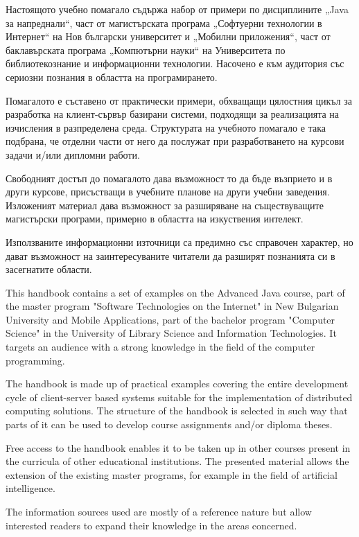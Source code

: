 ﻿Настоящото учебно помагало съдържа набор от примери по дисциплините „Java за напреднали“, част от магистърската програма „Софтуерни технологии в Интернет“ на Нов български университет и „Мобилни приложения“, част от баклавърската програма „Компютърни науки“ на Университета по библиотекознание и информационни технологии. Насочено е към аудитория със сериозни познания в областта на програмирането. 

Помагалото е съставено от практически примери, обхващащи цялостния цикъл за разработка на клиент-сървър базирани системи, подходящи за реализацията на изчисления в разпределена среда. Структурата на учебното помагало е така подбрана, че отделни части от него да послужат при разработването на курсови задачи и/или дипломни работи.

Свободният достъп до помагалото дава възможност то да бъде възприето и в други курсове, присъстващи в учебните планове на други учебни заведения. Изложеният материал дава възможност за разширяване на съществуващите магистърски програми, примерно в областта на изкуствения интелект.

Използваните информационни източници са предимно със справочен характер, но дават възможност на заинтересуваните читатели да разширят познанията си в засегнатите области. 

This handbook contains a set of examples on the Advanced Java course, part of the master program "Software Technologies on the Internet" in New Bulgarian University and Mobile Applications, part of the bachelor program "Computer Science" in the University of Library Science and Information Technologies. It targets an audience with a strong knowledge in the field of the computer programming.

The handbook is made up of practical examples covering the entire development cycle of client-server based systems suitable for the implementation of distributed computing solutions. The structure of the handbook is selected in such way that parts of it can be used to develop course assignments and/or diploma theses.

Free access to the handbook enables it to be taken up in other courses present in the curricula of other educational institutions. The presented material allows the extension of the existing master programs, for example in the field of artificial intelligence.

The information sources used are mostly of a reference nature but allow interested readers to expand their knowledge in the areas concerned.

